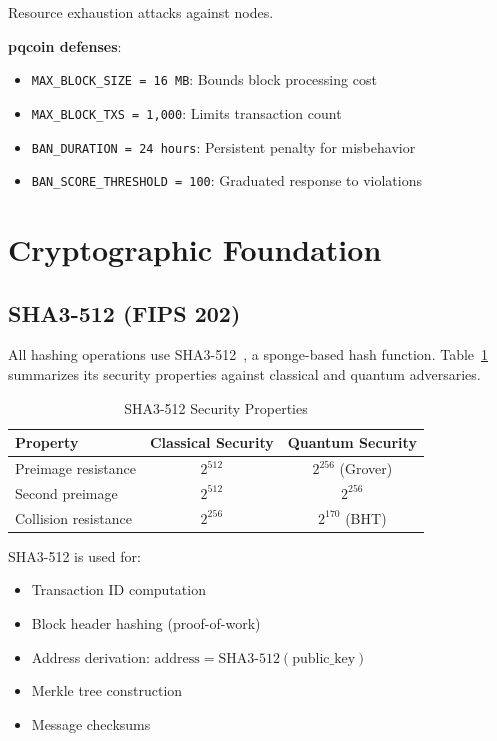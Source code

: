 \documentclass[11pt,a4paper]{article}
\begin{document}
Resource exhaustion attacks against nodes.

\textbf{pqcoin defenses}:
\begin{itemize}
    \item \texttt{MAX\_BLOCK\_SIZE = 16 MB}: Bounds block processing cost
    \item \texttt{MAX\_BLOCK\_TXS = 1,000}: Limits transaction count
    \item \texttt{BAN\_DURATION = 24 hours}: Persistent penalty for misbehavior
    \item \texttt{BAN\_SCORE\_THRESHOLD = 100}: Graduated response to violations
\end{itemize}

\section{Cryptographic Foundation}

\subsection{SHA3-512 (FIPS 202)}

All hashing operations use SHA3-512~\cite{fips202}, a sponge-based hash function. Table~\ref{tab:sha3-security} summarizes its security properties against classical and quantum adversaries.

\begin{table}[ht]
\centering
\caption{SHA3-512 Security Properties}
\label{tab:sha3-security}
\begin{tabular}{@{}lcc@{}}
\toprule
Property & Classical Security & Quantum Security \\
\midrule
Preimage resistance & $2^{512}$ & $2^{256}$ (Grover) \\
Second preimage & $2^{512}$ & $2^{256}$ \\
Collision resistance & $2^{256}$ & $2^{170}$ (BHT) \\
\bottomrule
\end{tabular}
\end{table}

SHA3-512 is used for:
\begin{itemize}
    \item Transaction ID computation
    \item Block header hashing (proof-of-work)
    \item Address derivation: $\text{address} = \text{SHA3-512}(\text{public\_key})$
    \item Merkle tree construction
    \item Message checksums
\end{itemize}
\end{document}
